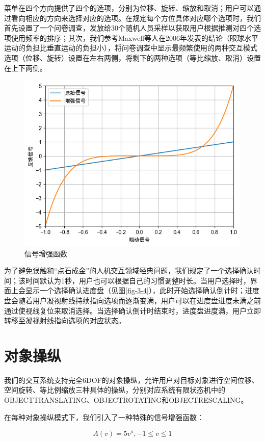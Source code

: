 菜单在四个方向提供了四个的选项，分别为位移、旋转、缩放和取消；用户可以通过看向相应的方向来选择对应的选项。在规定每个方位具体对应哪个选项时，我们首先设置了一个问卷调查，发放给30个随机人员采样以获取用户根据推测对四个选项使用频率的排序；其次，我们参考Maxwell等人在2006年发表的结论（眼球水平运动的负担比垂直运动的负担小），将问卷调查中显示最频繁使用的两种交互模式选项（位移、旋转）设置在左右两侧，将剩下的两种选项（等比缩放、取消）设置在上下两侧。

\begin{figure}[b!]
    \centering
    \includegraphics[width=.7\textwidth]{figure/augmented.png}
    \caption{信号增强函数}
    \label{fig-3-2}
\end{figure}

为了避免误触和“点石成金”的人机交互领域经典问题，我们规定了一个选择确认时间；该时间默认为1秒，用户也可以根据自己的习惯调整时长。当用户选择时，界面上会显示一个选择确认进度盘（见图\ref{fig-3-4}），此时开始选择确认倒计时；进度盘会随着用户凝视射线持续指向选项而逐渐变满，用户可以在进度盘进度未满之前通过使视线复位来取消选择。当选择确认倒计时结束时，进度盘进度满，用户立即转移至凝视射线指向选项的对应状态。

\section{对象操纵}\label{Manipulation}

我们的交互系统支持完全6DOF的对象操纵，允许用户对目标对象进行空间位移、空间旋转、等比例缩放三种具体的操纵，分别对应系统有限状态机中的OBJECT\us TRANSLATING、OBJECT\us ROTATING和OBJECT\us RESCALING。

在每种对象操纵模式下，我们引入了一种特殊的信号增强函数：

\begin{equation}
	\label{formula-3-1}
	A(v) = 5v^{5}, -1 \le v \le 1
\end{equation}

